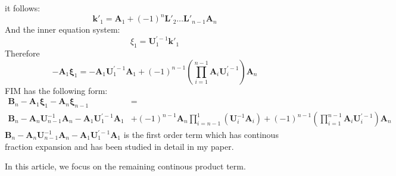 \documentclass[12pt]{article}
\begin{document}
it follows: 
\begin{equation}
\bm{k'}_{1}=\bm{A}_1+(-1)^n\bm{L}'_2\dots \bm{L}'_{n-1}\bm{A}_n
\end{equation}
And the inner equation system:
\begin{equation}
\xi_1=\bm{U}_1^{\bm{'}-1}\bm{k'}_1
\end{equation}
Therefore
\begin{equation}
-\bm{A}_1\bm{\xi}_1=-\bm{A}_1\bm{U}_1^{\bm{'}-1}\bm{A}_1+(-1)^{n-1}(\prod_{i=1}^{n-1}\bm{A}_i\bm{U}_i^{\bm{'}-1})\bm{A}_n
\end{equation}
FIM has the following form:
\begin{eqnarray*}
\bm{B}_n-\bm{A}_1\bm{\xi}_1-\bm{A}_n\bm{\xi}_{n-1}&=\\
\bm{B}_n-\bm{A}_n\bm{U}^{-1}_{n-1}\bm{A}_n-\bm{A}_1\bm{U}_1^{\bm{'}-1}\bm{A}_1&+
(-1)^{n-1}\bm{A}_n \prod_{i=n-1}^1 (\bm{U}_i^{-1}\bm{A}_i)+(-1)^{n-1}(\prod_{i=1}^{n-1}\bm{A}_i\bm{U}_i^{\bm{'}-1})\bm{A}_n
\end{eqnarray*}
$\bm{B}_n-\bm{A}_n\bm{U}^{-1}_{n-1}\bm{A}_n-\bm{A}_1\bm{U}_1^{\bm{'}-1}\bm{A}_1$ is the first order term which has continous fraction expansion and has been studied in detail in my paper.

In this article, we focus on the remaining continous product term.
\end{document}
